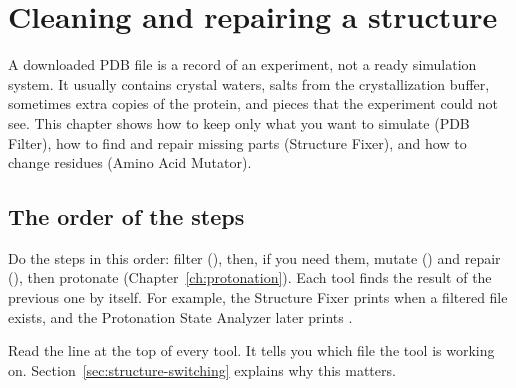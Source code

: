 \chapter{Cleaning and repairing a structure}
\label{ch:cleaning}

A downloaded PDB file is a record of an experiment, not a ready simulation
system. It usually contains crystal waters, salts from the crystallization
buffer, sometimes extra copies of the protein, and pieces that the experiment
could not see. This chapter shows how to keep only what you want to simulate
(PDB Filter), how to find and repair missing parts (Structure Fixer), and how to
change residues (Amino Acid Mutator).

\begin{glance}
\end{glance}

\section{The order of the steps}
\label{sec:cleaning-order}

Do the steps in this order: filter (), then, if you need them, mutate
() and repair (), then protonate (Chapter~\ref{ch:protonation}).
Each tool finds the result of the previous one by itself. For example, the
Structure Fixer prints  when a filtered file
exists, and the Protonation State Analyzer later prints
.

\begin{tip}
Read the  line at the top of every tool. It tells you which
file the tool is working on. Section~\ref{sec:structure-switching} explains why
this matters.
\end{tip}

